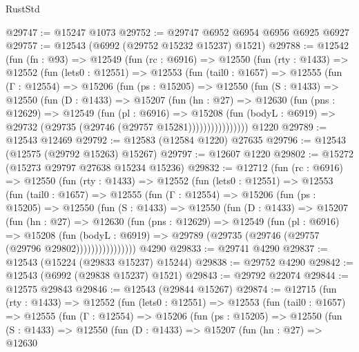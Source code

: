 \begin{lexlean}{RustStd}
\begin{coremodule}
@29747 := @15247 @1073
@29752 := @29747 @6952 @6954 @6956 @6925 @6927
@29757 := @12543 (@6992 (@29752 @15232 @15237) @1521)
@29788 := @12542
    (fun (fn : @93) =>
    @12549
      (fun (rc : @6916) =>
      @12550
        (fun (rty : @1433) =>
        @12552
          (fun (lets0 : @12551) =>
          @12553
            (fun (tail0 : @1657) =>
            @12555
              (fun (Γ : @12554) =>
              @15206
                (fun (ps : @15205) =>
                @12550
                  (fun (S : @1433) =>
                  @12550
                    (fun (D : @1433) =>
                    @15207
                      (fun (hn : @27) =>
                      @12630
                        (fun (pns : @12629) =>
                        @12549
                          (fun (pl : @6916) =>
                          @15208
                            (fun (bodyL : @6919) =>
                            @29732 (@29735 (@29746 (@29757 @15281))))))))))))))))
    @1220
@29789 := @12543 @12469
@29792 := @12583 (@12584 @1220) @27635
@29796 := @12543 (@12575 (@29792 @15263) @15267)
@29797 := @12607 @1220
@29802 := @15272 (@15273 @29797 @27638 @15234 @15236)
@29832 := @12712
    (fun (rc : @6916) =>
    @12550
      (fun (rty : @1433) =>
      @12552
        (fun (lets0 : @12551) =>
        @12553
          (fun (tail0 : @1657) =>
          @12555
            (fun (Γ : @12554) =>
            @15206
              (fun (ps : @15205) =>
              @12550
                (fun (S : @1433) =>
                @12550
                  (fun (D : @1433) =>
                  @15207
                    (fun (hn : @27) =>
                    @12630
                      (fun (pns : @12629) =>
                      @12549
                        (fun (pl : @6916) =>
                        @15208
                          (fun (bodyL : @6919) =>
                          @29789 (@29735 (@29746 (@29757 (@29796 @29802))))))))))))))))
    @4290
@29833 := @29741 @4290
@29837 := @12543 (@15224 (@29833 @15237) @15244)
@29838 := @29752 @4290
@29842 := @12543 (@6992 (@29838 @15237) @1521)
@29843 := @29792 @22074
@29844 := @12575 @29843
@29846 := @12543 (@29844 @15267)
@29874 := @12715
    (fun (rty : @1433) =>
    @12552
      (fun (lets0 : @12551) =>
      @12553
        (fun (tail0 : @1657) =>
        @12555
          (fun (Γ : @12554) =>
          @15206
            (fun (ps : @15205) =>
            @12550
              (fun (S : @1433) =>
              @12550
                (fun (D : @1433) =>
                @15207
                  (fun (hn : @27) =>
                  @12630

\end{coremodule}
\end{lexlean}
